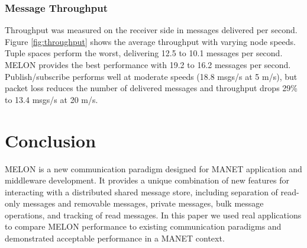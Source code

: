 \documentclass[lnicst]{svmultln}
\begin{document}
\subsubsection{Message Throughput}

Throughput was measured on the receiver side in messages delivered per second. Figure \ref{fig:throughput} shows the average throughput with varying node speeds. Tuple spaces perform the worst, delivering 12.5 to 10.1 messages per second. MELON provides the best performance with 19.2 to 16.2 messages per second. Publish/subscribe performs well at moderate speeds (18.8 msgs/s at 5 m/s), but packet loss reduces the number of delivered messages and throughput drops 29\% to 13.4 msgs/s at 20 m/s.






\section{Conclusion}\label{sec:conclusion}

MELON is a new communication paradigm designed for MANET application and middleware development. It provides a unique combination of new features for interacting with a distributed shared message store, including separation of read-only messages and removable messages, private messages, bulk message operations, and tracking of read messages. In this paper we used real applications to compare MELON performance to existing communication paradigms and demonstrated acceptable performance in a MANET context.
\end{document}
